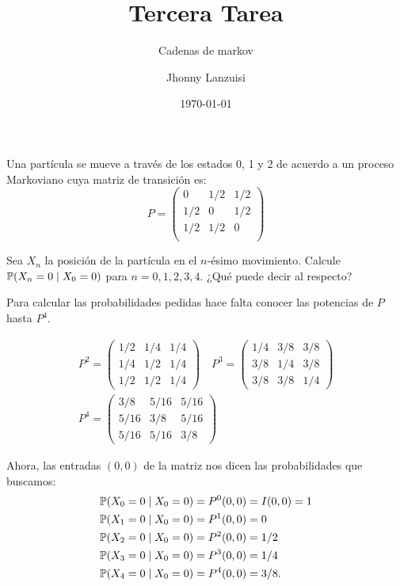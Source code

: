 \documentclass{scrartcl}
\begin{document}
%
\title{Tercera Tarea}
\subtitle{Cadenas de markov}
\subject{Aplicación a los procesos estocásticos discretos}
\titlehead{Universidad Simón Bolívar\hfill Caracas, Venezuela}
\author{Jhonny Lanzuisi}
\date{\today}
\maketitle

\setcounter{exer}{3}
\exercise
Una partícula se mueve a través de los estados 0, 1 y 2 de acuerdo
a un proceso Markoviano cuya matriz de transición es:
\[
	P = \begin{pmatrix}
		0 & 1/2 & 1/2 \\
		1/2 & 0 & 1/2 \\
		1/2 & 1/2 & 0 \\
	\end{pmatrix}	
\]

Sea $X_n$ la posición de la partícula en el $n$-ésimo movimiento.
Calcule $\mathbb{P}(X_n = 0\mid X_0 = 0)$ para
$n = 0, 1, 2, 3, 4$. ¿Qué puede decir al respecto?

\solution
Para calcular las probabilidades pedidas hace falta conocer las
potencias de $P$ hasta $P^4$.

\begin{gather*}
	P^2 = \begin{pmatrix}
		1/2 & 1/4 & 1/4 \\
		1/4 & 1/2 & 1/4 \\
		1/2 & 1/2 & 1/4
	\end{pmatrix}
	\quad
	P^3 = \begin{pmatrix}
		1/4 & 3/8 & 3/8 \\
		3/8 & 1/4 & 3/8 \\
		3/8 & 3/8 & 1/4
	\end{pmatrix} \\
	P^4 = \begin{pmatrix}
		3/8 & 5/16 & 5/16 \\
		5/16 & 3/8 & 5/16 \\
		5/16 & 5/16 & 3/8
	\end{pmatrix}
\end{gather*}

Ahora, las entradas $(0,0)$ de la matriz nos dicen las probabilidades
que buscamos:
\begin{align*}
	\mathbb{P}(X_0 = 0\mid X_0 = 0) &= P^0(0,0) = I(0,0) = 1\\
	\mathbb{P}(X_1 = 0\mid X_0 = 0) &= P^1(0,0) = 0\\
	\mathbb{P}(X_2 = 0\mid X_0 = 0) &= P^2(0,0) = 1/2\\
	\mathbb{P}(X_3 = 0\mid X_0 = 0) &= P^3(0,0) = 1/4\\
	\mathbb{P}(X_4 = 0\mid X_0 = 0) &= P^4(0,0) = 3/8.
\end{align*}
\end{document}
